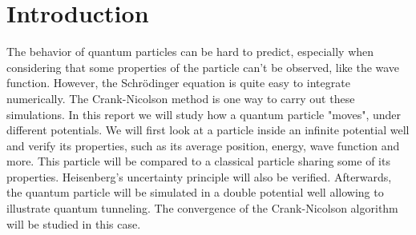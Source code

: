 \section{Introduction}

The behavior of quantum particles can be hard to predict, especially when considering that some properties of the particle can't be observed, like the wave function. However, the Schrödinger equation is quite easy to integrate numerically. The Crank-Nicolson method is one way to carry out these simulations. In this report we will study how a quantum particle "moves", under different potentials. We will first look at a particle inside an infinite potential well and verify its properties, such as its average position, energy, wave function and more. This particle will be compared to a classical particle sharing some of its properties. Heisenberg's uncertainty principle will also be verified. Afterwards, the quantum particle will be simulated in a double potential well allowing to illustrate quantum tunneling. The convergence of the Crank-Nicolson algorithm will be studied in this case.
